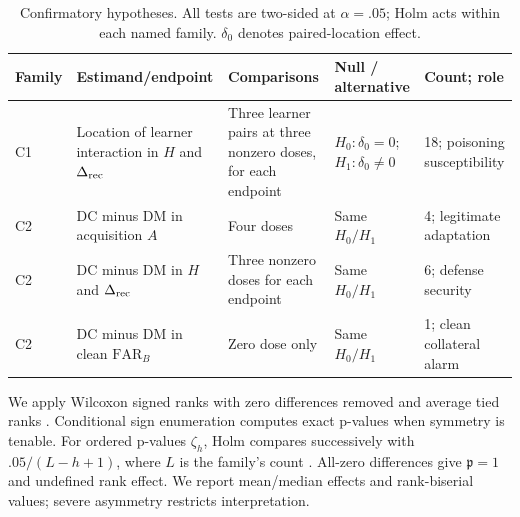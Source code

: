 \documentclass[10pt,a4paper]{article}
\begin{document}
\begin{table}[htbp]
\centering\footnotesize
\caption{Confirmatory hypotheses. All tests are two-sided at $\alpha=.05$; Holm acts within each named family. $\delta_0$ denotes paired-location effect.}
\label{tab:hypotheses}
\begin{tabularx}{\linewidth}{L{0.8cm}Y Y L{2.4cm}L{2.5cm}}
\toprule
Family & Estimand/endpoint & Comparisons & Null / alternative & Count; role\\
\midrule
C1 & Location of learner interaction in $H$ and $\Delta_{\rm rec}$ & Three learner pairs at three nonzero doses, for each endpoint & $H_0:\delta_0=0$; $H_1:\delta_0\ne0$ & 18; poisoning susceptibility\\
C2 & DC minus DM in acquisition $A$ & Four doses & Same $H_0/H_1$ & 4; legitimate adaptation\\
C2 & DC minus DM in $H$ and $\Delta_{\rm rec}$ & Three nonzero doses for each endpoint & Same $H_0/H_1$ & 6; defense security\\
C2 & DC minus DM in clean $\mathrm{FAR}_B$ & Zero dose only & Same $H_0/H_1$ & 1; clean collateral alarm\\
\bottomrule
\end{tabularx}
\end{table}
We apply Wilcoxon signed ranks with zero differences removed and average tied ranks \cite{wilcoxon}. Conditional sign enumeration computes exact p-values when symmetry is tenable. For ordered p-values $\zeta_h$, Holm compares successively with $.05/(L-h+1)$, where $L$ is the family's count \cite{holm}. All-zero differences give $\mathfrak p=1$ and undefined rank effect. We report mean/median effects and rank-biserial values; severe asymmetry restricts interpretation.
\end{document}
